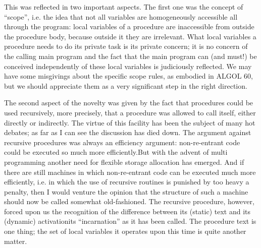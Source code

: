 This was reflected in two important aspects. The first one was the concept of ``scope'', i.e. the idea that not all variables are homogeneously accessible all through the program: local variables of a procedure are inaccessible from  outside the procedure body, because outside it they are irrelevant. What local variables a procedure needs to do its private task is its private concern; it is no concern of the calling main program and the fact that the main program can (and must!) be conceived independently of these local variables is judiciously reflected. We may have some misgivings about the specific scope rules, as embodied in ALGOL 60, but we should appreciate them as a very significant step in the right direction.

The second aspect of the novelty was given by the fact that procedures could be used recursively, more precisely, that a procedure was allowed to call itself, either directly or indirectly. The virtue of this facility has been the subject of many hot debates; as far as I can see the discussion has died down. The argument against recursive procedures was always an efficiency argument: non-re-entrant code could be executed so much more efficiently.But with the advent of multi programming another need for flexible storage allocation has emerged. And if there are still machines in which non-re-entrant code can be executed much more efficiently, i.e. in which the use of recursive routines is punished by too heavy a penalty, then I would venture the opinion that the structure of such a machine should now be called somewhat old-fashioned. The recursive procedure, however, forced upon us the recognition of the difference between its (static) text and its (dynamic) activation\textemdash{}its ``incarnation'' as it has been called. The procedure text is one thing; the set of local variables it operates upon this time is quite another matter.

